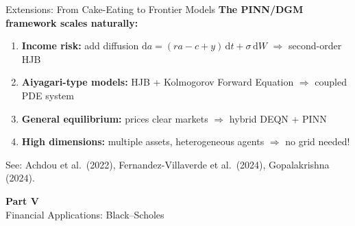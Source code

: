\documentclass[aspectratio=169,11pt]{beamer}
\begin{document}
\begin{frame}{Extensions: From Cake-Eating to Frontier Models}
\textbf{The PINN/DGM framework scales naturally:}

\vspace{0.3em}
\begin{enumerate}
    \item \textbf{Income risk:} add diffusion $\mathrm{d}a = (ra - c + y)\,\mathrm{d}t + \sigma\,\mathrm{d}W$
    \quad$\Rightarrow$ second-order HJB

    \vspace{0.2em}
    \item \textbf{Aiyagari-type models:} HJB + Kolmogorov Forward Equation
    \quad$\Rightarrow$ coupled PDE system

    \vspace{0.2em}
    \item \textbf{General equilibrium:} prices clear markets
    \quad$\Rightarrow$ hybrid DEQN + PINN

    \vspace{0.2em}
    \item \textbf{High dimensions:} multiple assets, heterogeneous agents
    \quad$\Rightarrow$ no grid needed!
\end{enumerate}

\vspace{0.3em}
{\small See: Achdou et al.\ (2022), Fernandez-Villaverde et al.\ (2024), Gopalakrishna (2024).}
\end{frame}


\begin{frame}{}
\vfill
\begin{center}
{\Huge \textcolor{uzhblue}{\textbf{Part V}}}\\[12pt]
{\LARGE Financial Applications: Black--Scholes}
\end{center}
\vfill
\end{frame}
\end{document}

